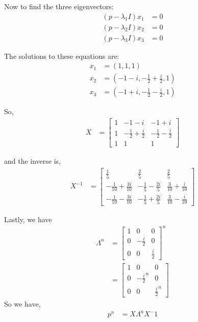 \documentclass[12pt]{article}
\begin{document}
\begin{enumerate}[label=(\Alph*)]
Now to find the three eigenvectors:
\begin{align*}
(p - \lambda_1 I)x_1 &= 0\\
(p - \lambda_2 I)x_2 &= 0\\
(p - \lambda_3 I)x_3 &= 0
\end{align*}

The solutions to these equations are:
\begin{align*}
x_1 &= (1, 1, 1)\\
x_2 &= (-1 - i, -\frac{1}{2} + \frac{i}{2}, 1)\\
x_3 &= (-1 + i, -\frac{1}{2} - \frac{i}{2}, 1)
\end{align*}

So,
\begin{align*}
X &= \begin{bmatrix}
1 & -1 - i & -1 + i\\
1 & -\frac{1}{2} + \frac{i}{2} & -\frac{1}{2} - \frac{i}{2}\\
1 & 1 & 1
\end{bmatrix}
\end{align*}

and the inverse is,
\begin{align*}
X^{-1} &= \begin{bmatrix}
\frac{1}{5} & \frac{2}{5} & \frac{2}{5}\\
-\frac{1}{10} + \frac{3i}{10} & -\frac{1}{5} - \frac{2i}{5} & \frac{3}{10} + \frac{i}{10}\\
-\frac{1}{10} - \frac{3i}{10} & -\frac{1}{5} + \frac{2i}{5} & \frac{3}{10} - \frac{i}{10}
\end{bmatrix}
\end{align*}

Lastly, we have
\begin{align*}
\Lambda^n &= \begin{bmatrix}
1 & 0 & 0\\
0 & -\frac{i}{2} & 0\\
0 & 0 & \frac{i}{2}
\end{bmatrix}^n\\
&= \begin{bmatrix}
1 & 0 & 0\\
0 & -\frac{i}{2}^n & 0\\
0 & 0 & \frac{i}{2}^n
\end{bmatrix}
\end{align*}
So we have,
\begin{align*}
p^n &= X \Lambda^n X^-1
\end{align*}


\end{enumerate}
\end{document}
